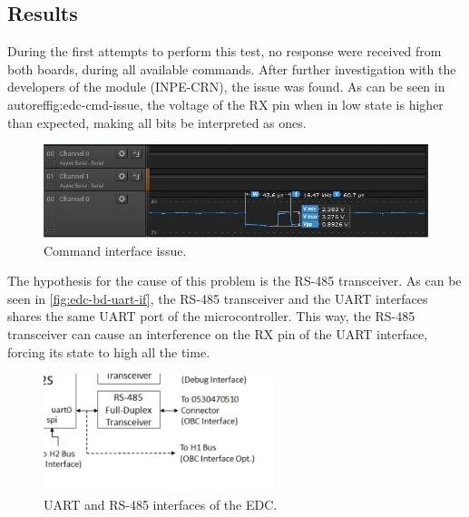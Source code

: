 \subsection{Results}

During the first attempts to perform this test, no response were received from both boards, during all available commands. After further investigation with the developers of the module (INPE-CRN), the issue was found. As can be seen in autoref{fig:edc-cmd-issue}, the voltage of the RX pin when in low state is higher than expected, making all bits be interpreted as ones.

\begin{figure}[!ht]
    \begin{center}
        \includegraphics[width=\textwidth]{figures/edc_report/edc-cmd-issue}
        \caption{Command interface issue.}
        \label{fig:edc-cmd-issue}
    \end{center}
\end{figure}

The hypothesis for the cause of this problem is the RS-485 transceiver. As can be seen in \autoref{fig:edc-bd-uart-if}, the RS-485 transceiver and the UART interfaces shares the same UART port of the microcontroller. This way, the RS-485 transceiver can cause an interference on the RX pin of the UART interface, forcing its state to high all the time.

\begin{figure}[!ht]
    \begin{center}
        \includegraphics[width=0.6\textwidth]{figures/edc_report/edc-bd-uart-if}
        \caption{UART and RS-485 interfaces of the EDC.}
        \label{fig:edc-bd-uart-if}
    \end{center}
\end{figure}


